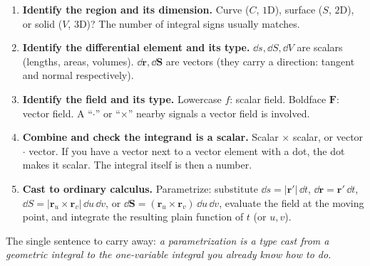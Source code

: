 \documentclass{essay}
\newcommand{\F}{\mathbf{F}}
\newcommand{\rr}{\mathbf{r}}
\begin{document}
\begin{enumerate}[leftmargin=1.6em]
  \item \textbf{Identify the region and its dimension.} Curve ($C$, $1$D), surface
    ($S$, $2$D), or solid ($V$, $3$D)? The number of integral signs usually matches.
  \item \textbf{Identify the differential element and its type.} $\dd s,\dd S,\dd V$
    are scalars (lengths, areas, volumes). $\dd\mathbf{r},\dd\mathbf{S}$ are vectors
    (they carry a direction: tangent and normal respectively).
  \item \textbf{Identify the field and its type.} Lowercase $f$: scalar field.
    Boldface $\F$: vector field. A ``$\cdot$'' or ``$\times$'' nearby signals a vector
    field is involved.
  \item \textbf{Combine and check the integrand is a scalar.} Scalar $\times$ scalar,
    or vector $\cdot$ vector. If you have a vector next to a vector element with a dot,
    the dot makes it scalar. The integral itself is then a number.
  \item \textbf{Cast to ordinary calculus.} Parametrize: substitute
    $\dd s=\lvert\rr'\rvert\,\dd t$, $\dd\mathbf{r}=\rr'\,\dd t$,
    $\dd S=\lvert\rr_u\times\rr_v\rvert\,\dd u\,\dd v$, or
    $\dd\mathbf{S}=(\rr_u\times\rr_v)\,\dd u\,\dd v$, evaluate the field at the moving
    point, and integrate the resulting plain function of $t$ (or $u,v$).
\end{enumerate}

The single sentence to carry away: \emph{a parametrization is a type cast from a
geometric integral to the one-variable integral you already know how to do.}
\end{document}
